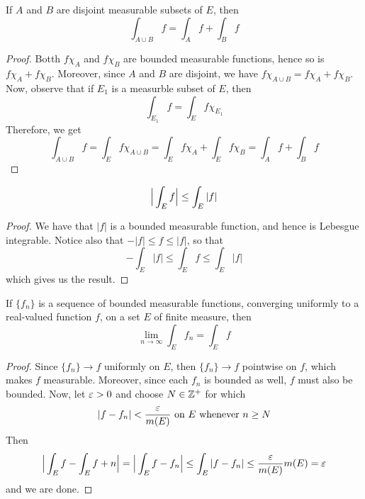 \begin{corollary}
    If $A$ and  $B$ are disjoint measurable subsets of $E$, then
    \begin{equation*}
        \int_{A \cup B}{f}=\int_A{f}+\int_{B}{f}
    \end{equation*}
\end{corollary}
\begin{proof}
    Botth $f\chi_A$ and  $f\chi_B$ are bounded measurable functions, hence so is
     $f\chi_A+f\chi_B$. Moreover, since  $A$ and  $B$ are disjoint, we have
     $f\chi_{A \cup B}=f\chi_A+f\chi_B$. Now, observe that if $E_1$ is a
     measurble subset of $E$, then
     \begin{equation*}
         \int_{E_1}{f}=\int_E{f\chi_{E_1}}
     \end{equation*}
     Therefore, we get
     \begin{equation*}
         \int_{A \cup B}{f}=\int_E{f\chi_{A \cup B}}=
         \int_E{f\chi_A}+\int_E{f\chi_B}=\int_A{f}+\int_B{f}
     \end{equation*}
\end{proof}
\begin{corollary}
    \begin{equation*}
        \Big{|} \int_E{f} \Big{|} \leq \int_E{|f|}
    \end{equation*}
\end{corollary}
\begin{proof}
    We have that $|f|$ is a bounded measurable function, and hence is Lebesgue
    integrable. Notice also that  $-|f| \leq f \leq |f|$, so that
    \begin{equation*}
        -\int_E{|f|} \leq \int_E{f} \leq \int_E{|f|}
    \end{equation*}
    which gives us the result.
\end{proof}

\begin{lemma}\label{10.1.6}
    If $\{f_n\}$ is a sequence of bounded measurable functions, converging
    uniformly to a real-valued function $f$, on a set $E$ of finite measure, then
    \begin{equation*}
        \lim_{n \xrightarrow{} \infty}{\int_E{f_n}}=\int_E{f}
    \end{equation*}
\end{lemma}
\begin{proof}
    Since $\{f_n\} \xrightarrow{} f$ uniformly on $E$, then $\{f_n\}
    \xrightarrow{} f$ pointwise on $f$, which makes  $f$ measurable. Moreover,
    since each  $f_n$ is bounded as well,  $f$ must also be bounded. Now, let
    $\varepsilon>0$ and choose  $N \in \mathbb{Z}^+$ for which
    \begin{equation*}
        |f-f_n|<\frac{\varepsilon}{m(E)} \text{ on }  E \text{ whenever } n \geq N
    \end{equation*}
    Then
    \begin{equation*}
        \Big{|} \int_E{f}-\int_E{f+n} \Big{|}=
        \Big{|} \int_E{f-f_n} \Big{|} \leq \int_E{|f-f_n|} \leq
        \frac{\varepsilon}{m(E)}m(E)=\varepsilon
    \end{equation*}
    and we are done.
\end{proof}

